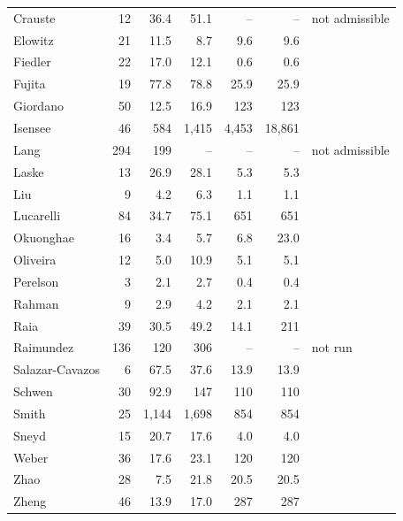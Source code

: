 \begin{longtable}{@{}lrrrrrl@{}}
Crauste & 12 & 36.4 & 51.1 & -- & -- & not admissible \\
Elowitz & 21 & 11.5 & 8.7 & 9.6 & 9.6 &  \\
Fiedler & 22 & 17.0 & 12.1 & 0.6 & 0.6 &  \\
Fujita & 19 & 77.8 & 78.8 & 25.9 & 25.9 &  \\
Giordano & 50 & 12.5 & 16.9 & 123 & 123 &  \\
Isensee & 46 & 584 & 1,415 & 4,453 & 18,861 &  \\
Lang & 294 & 199 & -- & -- & -- & not admissible \\
Laske & 13 & 26.9 & 28.1 & 5.3 & 5.3 &  \\
Liu & 9 & 4.2 & 6.3 & 1.1 & 1.1 &  \\
Lucarelli & 84 & 34.7 & 75.1 & 651 & 651 &  \\
Okuonghae & 16 & 3.4 & 5.7 & 6.8 & 23.0 &  \\
Oliveira & 12 & 5.0 & 10.9 & 5.1 & 5.1 &  \\
Perelson & 3 & 2.1 & 2.7 & 0.4 & 0.4 &  \\
Rahman & 9 & 2.9 & 4.2 & 2.1 & 2.1 &  \\
Raia & 39 & 30.5 & 49.2 & 14.1 & 211 &  \\
Raimundez & 136 & 120 & 306 & -- & -- & not run \\
Salazar-Cavazos & 6 & 67.5 & 37.6 & 13.9 & 13.9 &  \\
Schwen & 30 & 92.9 & 147 & 110 & 110 &  \\
Smith & 25 & 1,144 & 1,698 & 854 & 854 &  \\
Sneyd & 15 & 20.7 & 17.6 & 4.0 & 4.0 &  \\
Weber & 36 & 17.6 & 23.1 & 120 & 120 &  \\
Zhao & 28 & 7.5 & 21.8 & 20.5 & 20.5 &  \\
Zheng & 46 & 13.9 & 17.0 & 287 & 287 &  \\
\bottomrule
\end{longtable}
